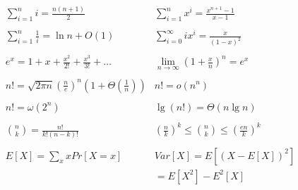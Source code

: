 $$
\begin{array}{lr}
	\sum_{i=1}^n i = \frac{n(n+1)}{2}
	& 
	\sum_{i=1}^n x^i = \frac{x^{n+1} - 1}{x-1}
	\\
	\\
	\sum_{i=1}^n \frac{1}{i} = \ln n + O(1)
	& 
	\sum_{i=0}^{\infty} ix^i = \frac{x}{(1-x)^2}
	\\
	\\
	e^x = 1 + x + \frac{x^2}{2!} + \frac{x^3}{3!} + \ldots
	& 
	\lim_{n\rightarrow\infty} (1+\frac{x}{n})^n = e^x
	\\
	\\
	n! = \sqrt{2\pi n} (\frac{n}{e})^n (1 + \Theta(\frac{1}{n}))
	& 
	n! = o(n^n)
	\\
	\\
	n! = \omega(2^n)
	& 
	\lg(n!) = \Theta(n\lg n)
	\\
	\\
	{n \choose k} = \frac{n!}{k!(n-k)!}
	& 
	(\frac{n}{k})^k \leq {n \choose k} \leq (\frac{en}{k})^k
	\\
	\\
	E[X] = \sum_x x Pr[X=x]
	& 
	Var[X] = E[(X-E[X])^2]\\ 
	&= E[X^2] - E^2[X]

\end{array}
$$

